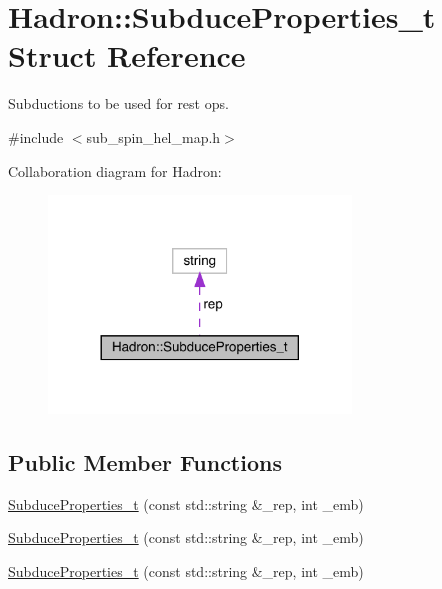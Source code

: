 \hypertarget{structHadron_1_1SubduceProperties__t}{}\section{Hadron\+:\+:Subduce\+Properties\+\_\+t Struct Reference}
\label{structHadron_1_1SubduceProperties__t}


Subductions to be used for rest ops.  




{\ttfamily \#include $<$sub\+\_\+spin\+\_\+hel\+\_\+map.\+h$>$}



Collaboration diagram for Hadron\+:\nopagebreak
\begin{figure}[H]
\begin{center}
\leavevmode
\includegraphics[width=228pt]{d9/d19/structHadron_1_1SubduceProperties__t__coll__graph}
\end{center}
\end{figure}
\subsection*{Public Member Functions}
\begin{DoxyCompactItemize}
\item 
\mbox{\hyperlink{structHadron_1_1SubduceProperties__t_a265cb361b85b50a1619fda24fc575389}{Subduce\+Properties\+\_\+t}} (const std\+::string \&\+\_\+rep, int \+\_\+emb)
\item 
\mbox{\hyperlink{structHadron_1_1SubduceProperties__t_a265cb361b85b50a1619fda24fc575389}{Subduce\+Properties\+\_\+t}} (const std\+::string \&\+\_\+rep, int \+\_\+emb)
\item 
\mbox{\hyperlink{structHadron_1_1SubduceProperties__t_a265cb361b85b50a1619fda24fc575389}{Subduce\+Properties\+\_\+t}} (const std\+::string \&\+\_\+rep, int \+\_\+emb)
\end{DoxyCompactItemize}
